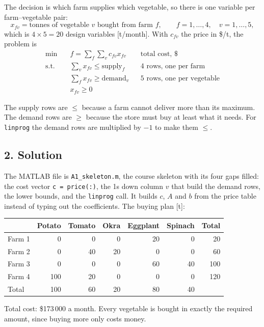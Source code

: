 \documentclass[11pt,a4paper]{article}
\begin{document}
The decision is which farm supplies which vegetable, so there is one variable
per farm--vegetable pair:
\[
  x_{fv} = \text{tonnes of vegetable } v \text{ bought from farm } f,
  \qquad f = 1,\dots,4, \quad v = 1,\dots,5,
\]
which is $4 \times 5 = 20$ design variables [t/month]. With $c_{fv}$ the price
in \$/t, the problem is
\begin{align*}
  \min \quad & f = \sum_f \sum_v c_{fv} x_{fv} && \text{total cost, \$} \\
  \text{s.t.} \quad
  & \sum_v x_{fv} \le \text{supply}_f && \text{4 rows, one per farm} \\
  & \sum_f x_{fv} \ge \text{demand}_v && \text{5 rows, one per vegetable} \\
  & x_{fv} \ge 0
\end{align*}

The supply rows are $\le$ because a farm cannot deliver more than its maximum.
The demand rows are $\ge$ because the store must buy at least what it needs.
For \texttt{linprog} the demand rows are multiplied by $-1$ to make them $\le$.

\subsection*{2. Solution}

The MATLAB file is \texttt{A1\_skeleton.m}, the course skeleton with its four
gaps filled: the cost vector \texttt{c = price(:)}, the 1s down column $v$ that
build the demand rows, the lower bounds, and the \texttt{linprog} call. It
builds $c$, $A$ and $b$ from the price table instead of typing out the
coefficients. The buying plan [t]:

\begin{center}
\begin{tabular}{lrrrrrr}
\toprule
 & Potato & Tomato & Okra & Eggplant & Spinach & Total \\
\midrule
Farm 1 & 0   & 0  & 0  & 20 & 0  & 20 \\
Farm 2 & 0   & 40 & 20 & 0  & 0  & 60 \\
Farm 3 & 0   & 0  & 0  & 60 & 40 & 100 \\
Farm 4 & 100 & 20 & 0  & 0  & 0  & 120 \\
\midrule
Total  & 100 & 60 & 20 & 80 & 40 & \\
\bottomrule
\end{tabular}
\end{center}

Total cost: \$173\,000 a month. Every vegetable is bought in exactly the
required amount, since buying more only costs money.
\end{document}
